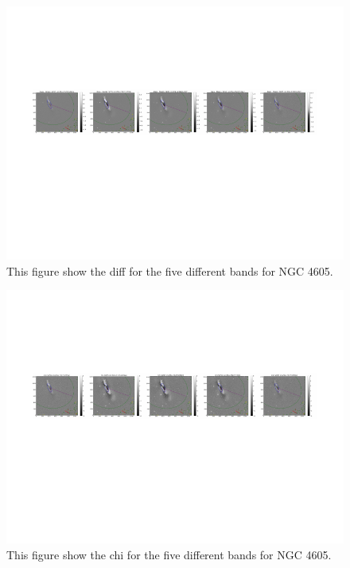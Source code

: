 \documentclass[12pt,preprint,pdftex]{aastex}
\begin{document}
\clearpage
\begin{figure}
\centering
\includegraphics[trim = .9cm 4.5cm 0cm 2.9cm,clip=true,width=\textwidth] {goodsingle-colors-diff.pdf}
\caption{This figure show the diff for the five different bands for NGC 4605.}
\label{fig:colorsdiff}
\end{figure}
\begin{figure}
\centering
\includegraphics[trim = .9cm 4.5cm 0cm 2.9cm,clip=true,width=\textwidth] {goodsingle-colors-chi.pdf}
\caption{This figure show the chi for the five different bands for NGC 4605.}
\label{fig:colorschi}
\end{figure}
\end{document}
